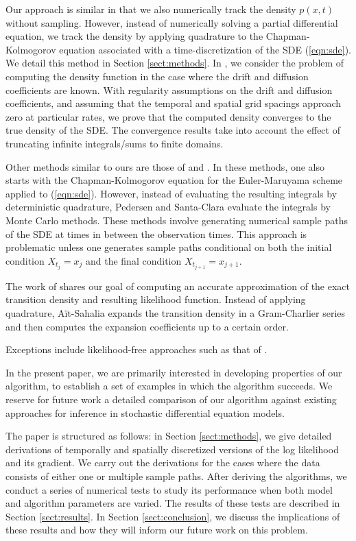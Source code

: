 \documentclass[wcp]{jmlr}
\begin{document}
Our approach is similar in that we also numerically track the density $p(x,t)$ without sampling.  However, instead of numerically solving a partial differential equation, we track the density by applying quadrature to the Chapman-Kolmogorov equation associated with a time-discretization of the SDE (\ref{eqn:sde}). We detail this method in Section \ref{sect:methods}.  In \citep{BhatMadu2016}, we consider the problem of computing the density function in the case where the drift and diffusion coefficients are known.  With regularity assumptions on the drift and diffusion coefficients, and assuming that the temporal and spatial grid spacings approach zero at particular rates, we prove that the computed density converges to the true density of the SDE.  The convergence results take into account the effect of truncating infinite integrals/sums to finite domains.

Other methods similar to ours are those of \citep{Pedersen1995} and \citep{SantaClara1997}.  In these methods, one also starts with the Chapman-Kolmogorov equation for the Euler-Maruyama scheme applied to (\ref{eqn:sde}).  However, instead of evaluating the resulting integrals by deterministic quadrature, Pedersen and Santa-Clara evaluate the integrals by Monte Carlo methods.  These methods involve generating numerical sample paths of the SDE at times in between the observation times.  This approach is problematic unless one generates sample paths conditional on both the initial condition $X_{t_j} = x_j$ and the final condition $X_{t_{j+1}} = x_{j+1}$.

The work of \citep{Sahaliaclosedform} shares our goal of computing an accurate approximation of the exact transition density and resulting likelihood function.  Instead of applying quadrature, A\"it-Sahalia expands the transition density in a Gram-Charlier series and then computes the expansion coefficients up to a certain order.  

Exceptions include likelihood-free approaches such as that of \citep{Picchini2014}.

In the present paper, we are primarily interested in developing properties of our algorithm, to establish a set of examples in which the algorithm succeeds.  We reserve for future work a detailed comparison of our algorithm against existing approaches for inference in stochastic differential equation models.

The paper is structured as follows: in Section \ref{sect:methods}, we give detailed derivations of temporally and spatially discretized versions of the log likelihood and its gradient.  We carry out the derivations for the cases where the data consists of either one or multiple sample paths.  After deriving the algorithms, we conduct a series of numerical tests to study its performance when both model and algorithm parameters are varied.  The results of these tests are described in Section \ref{sect:results}.  In Section \ref{sect:conclusion}, we discuss the implications of these results and how they will inform our future work on this problem.
\end{document}

